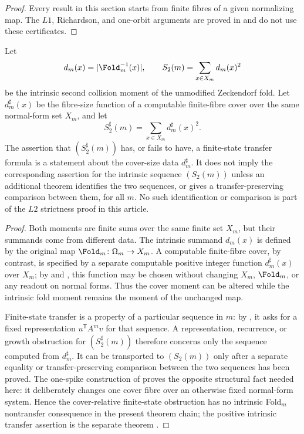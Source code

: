 \begin{proof}
Every result in this section starts from finite fibres of a given normalizing
map.  The \(L1\), Richardson, and one-orbit arguments are proved in
 and do not use these certificates.
\end{proof}

\begin{theorem}
\label{thm:L2-cover-intrinsic-nonimplication}
Let
\[
  d_m(x)=|\Fold_m^{-1}(x)|,
  \qquad S_2(m)=\sum_{x\in X_m}d_m(x)^2
\]
be the intrinsic second collision moment of the unmodified Zeckendorf fold.  Let
\(d_m^\sharp(x)\) be the fibre-size function of a computable finite-fibre cover
over the same normal-form set \(X_m\), and let
\[
  S_2^\sharp(m)=\sum_{x\in X_m}d_m^\sharp(x)^2 .
\]
The assertion that \((S_2^\sharp(m))\) has, or fails to have, a finite-state
transfer formula is a statement about the cover-size data \(d_m^\sharp\).  It
does not imply the corresponding assertion for the intrinsic sequence
\((S_2(m))\) unless an additional theorem identifies the two sequences, or gives
a transfer-preserving comparison between them, for all \(m\).  No such
identification or comparison is part of the \(L2\) strictness proof in this
article.
\end{theorem}

\begin{proof}
Both moments are finite sums over the same finite set \(X_m\), but their summands
come from different data.  The intrinsic summand \(d_m(x)\) is defined by the
original map \(\Fold_m\colon\Omega_m\to X_m\).  A computable finite-fibre cover,
by contrast, is specified by a separate computable positive integer function
\(d_m^\sharp(x)\) over \(X_m\); by  and
, this function may be chosen without
changing \(X_m\), \(\Fold_m\), or any readout on normal forms.  Thus the cover
moment can be altered while the intrinsic fold moment remains the moment of the
unchanged map.

Finite-state transfer is a property of a particular sequence in \(m\): by
, it asks for a fixed representation
\(u^{\mathsf T}A^m v\) for that sequence.  A representation, recurrence, or
growth obstruction for \((S_2^\sharp(m))\) therefore concerns only the sequence
computed from \(d_m^\sharp\).  It can be transported to \((S_2(m))\) only after a
separate equality or transfer-preserving comparison between the two sequences has
been proved.  The one-spike construction of
 proves the opposite structural
fact needed here: it deliberately changes one cover fibre over an otherwise
fixed normal-form system.  Hence the cover-relative finite-state obstruction has
no intrinsic Fold\(_m\) nontransfer consequence in the present theorem chain; the
positive intrinsic transfer assertion is the separate theorem
.
\end{proof}

